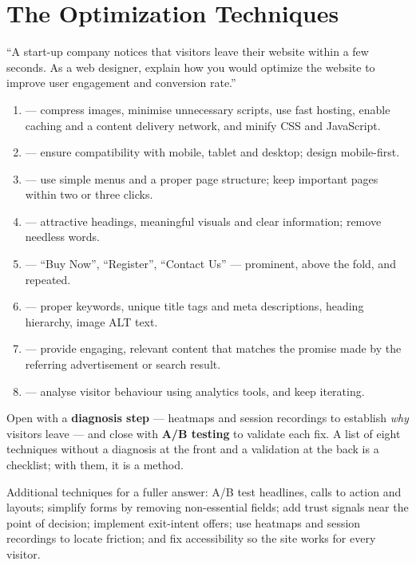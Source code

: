 \documentclass{MMTextbook}
\begin{document}
\section{The Optimization Techniques}

\begin{keybox}
``A start-up company notices that visitors leave their website within a few
seconds. As a web designer, explain how you would optimize the website to improve
user engagement and conversion rate.''
\end{keybox}

\begin{enumerate}
\item {} --- compress images, minimise
      unnecessary scripts, use fast hosting, enable caching and a content
      delivery network, and minify CSS and JavaScript.
\item {} --- ensure compatibility with mobile,
      tablet and desktop; design mobile-first.
\item {} --- use simple menus and a proper page structure;
      keep important pages within two or three clicks.
\item {} --- attractive headings, meaningful visuals
      and clear information; remove needless words.
\item {} --- ``Buy Now'', ``Register'',
      ``Contact Us'' --- prominent, above the fold, and repeated.
\item {} --- proper keywords, unique title tags and meta
      descriptions, heading hierarchy, image ALT text.
\item {} --- provide engaging, relevant content that matches
      the promise made by the referring advertisement or search result.
\item {} --- analyse visitor behaviour using analytics
      tools, and keep iterating.
\end{enumerate}

\begin{keybox}
Open with a \textbf{diagnosis step} --- heatmaps and session recordings to
establish \emph{why} visitors leave --- and close with \textbf{A/B testing} to
validate each fix. A list of eight techniques without a diagnosis at the front
and a validation at the back is a checklist; with them, it is a method.

\smallskip
Additional techniques for a fuller answer: A/B test headlines, calls to action
and layouts; simplify forms by removing non-essential fields; add trust signals
near the point of decision; implement exit-intent offers; use heatmaps and
session recordings to locate friction; and fix accessibility so the site works
for every visitor.
\end{keybox}
\end{document}
